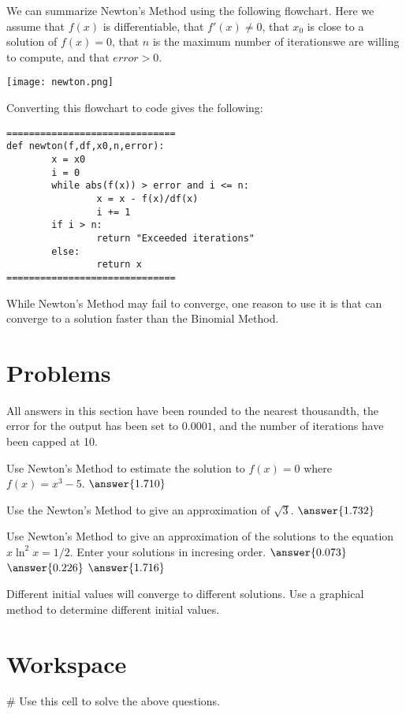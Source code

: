 \documentclass{ximera}
\begin{document}
We can summarize Newton's Method using the following flowchart. Here we assume that $f(x)$ is differentiable, that $f'(x)\neq 0$, that $x_0$ is close to a solution of $f(x)=0$, that $n$ is the maximum number of iterationswe are willing to compute, and that $error>0$.

\begin{center}
	\texttt{[image: newton.png]}
\end{center}

Converting this flowchart to code gives the following:

\begin{verbatim}
==============================
def newton(f,df,x0,n,error):
        x = x0
        i = 0
        while abs(f(x)) > error and i <= n:
                x = x - f(x)/df(x)
                i += 1
        if i > n:
                return "Exceeded iterations"
        else:
                return x
==============================
\end{verbatim}

While Newton's Method may fail to converge, one reason to use it is that can converge to a solution faster than the Binomial Method.

\section{Problems}

All answers in this section have been rounded to the nearest thousandth, the error for the output has been set to $0.0001$, and the number of iterations have been capped at 10.

\begin{question}
	Use Newton's Method to estimate the solution to $f(x)=0$ where $f(x)=x^3-5$. $\answer{1.710}$ 
\end{question}

\begin{question}
	Use the Newton's Method to give an approximation of $\sqrt{3}$. $\answer{1.732}$
\end{question}

\begin{question}
	Use Newton's Method to give an approximation of the solutions to the equation $x\ln^2{x}=1/2$. Enter your solutions in incresing order. $\answer{0.073}$ $\answer{0.226}$ $\answer{1.716}$
	\begin{hint}
	Different initial values will converge to different solutions. Use a graphical method to determine different initial values.
	\end{hint}
\end{question}

\section{Workspace}

\begin{sageCell}
# Use this cell to solve the above questions.
\end{sageCell}
\end{document}
